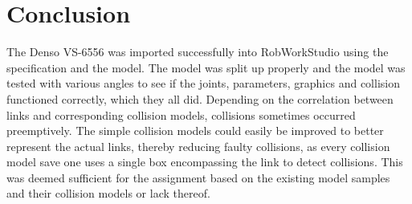 \section{Conclusion}
\label{sec:conclusion}

The Denso VS-6556 was imported successfully into RobWorkStudio using the specification and the model. The model was split up properly and the model was tested with various angles to see if the joints, parameters, graphics and collision functioned correctly, which they all did. Depending on the correlation between links and corresponding collision models, collisions sometimes occurred preemptively. The simple collision models could easily be improved to better represent the actual links, thereby reducing faulty collisions, as every collision model save one uses a single box encompassing the link to detect collisions. This was deemed sufficient for the assignment based on the existing model samples and their collision models or lack thereof.
